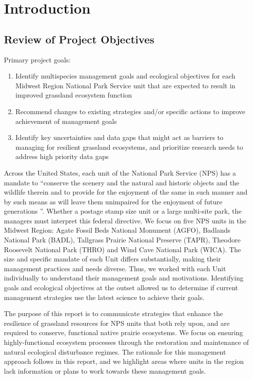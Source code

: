 \section{Introduction}\label{sec:intro}

\subsection{Review of Project Objectives}\label{ssec:objectives}

Primary project goals:

\begin{enumerate}
	\item Identify multi\textendash species management goals and ecological objectives for each Midwest Region National Park Service unit that are expected to result in improved grassland ecosystem function
	\item 	Recommend changes to existing strategies and/or specific actions to improve achievement of management goals 
	\item Identify key uncertainties and data gaps that might act as barriers to managing for resilient grassland ecosystems, and prioritize research needs to address high priority data gaps
\end{enumerate}

Across the United States, each unit of the National Park Service (NPS) has a mandate to ``conserve the scenery and the natural and historic objects and the wildlife therein and to provide for the enjoyment of the same in such manner and by such means as will leave them unimpaired for the enjoyment of future generations \citep{organicact1916}''. 
Whether a postage stamp size unit or a large multi-site park, the managers must interpret this federal directive. 
We focus on five NPS units in the Midwest Region: Agate Fossil Beds National Monument (AGFO), Badlands National Park (BADL), Tallgrass Prairie National Preserve (TAPR), Theodore Roosevelt National Park (THRO) and Wind Cave National Park (WICA).
The size and specific mandate of each Unit differs substantially, making their management practices and needs diverse. 
Thus, we worked with each Unit individually to understand their management goals and motivations. 
Identifying goals and ecological objectives at the outset allowed us to determine if current management strategies use the latest science to achieve their goals.

The purpose of this report is to communicate strategies that enhance the resilience of grassland resources for NPS units that both rely upon, and are required to conserve, functional native prairie ecosystems. 
We focus on ensuring highly-functional ecosystem processes through the restoration and maintenance of natural ecological disturbance regimes. 
The rationale for this management approach follows in this report, and we highlight areas where units in the region lack information or plans to work towards these management goals.


